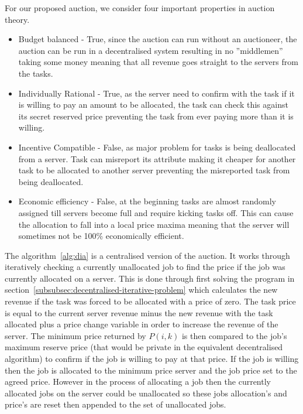 For our proposed auction, we consider four important properties in auction theory.
\begin{itemize}
    \item Budget balanced - True, since the auction can run without an auctioneer, the auction can be run in a
    decentralised system resulting in no ''middlemen'' taking some money meaning that all revenue goes straight to
    the servers from the tasks.
    \item Individually Rational - True, as the server need to confirm with the task if it is willing to pay an amount
    to be allocated, the task can check this against its secret reserved price preventing the task from ever paying
    more than it is willing.
    \item Incentive Compatible - False, as major problem for tasks is being deallocated from a server. Task can
    misreport its attribute making it cheaper for another task to be allocated to another server preventing the
    misreported task from being deallocated.
    \item Economic efficiency - False, at the beginning tasks are almost randomly assigned till servers become full and
    require kicking tasks off. This can cause the allocation to fall into a local price maxima meaning that the
    server will sometimes not be 100\% economically efficient.
\end{itemize}

The algorithm~\ref{alg:dia} is a centralised version of the auction. It works through iteratively checking a currently
unallocated job to find the price if the job was currently allocated on a server. This is done through first solving
the program in section~\ref{subsubsec:decentralised-iterative-problem} which calculates the new revenue if the task was
forced to be allocated with a price of zero. The task price is equal to the current server revenue minus the new
revenue with the task allocated plus a price change variable in order to increase the revenue of the server. The
minimum price returned by $P(i, k)$ is then compared to the job's maximum reserve price (that would be private in the
equivalent decentralised algorithm) to confirm if the job is willing to pay at that price. If the job is willing then
the job is allocated to the minimum price server and the job price set to the agreed price. However in the process of
allocating a job then the currently allocated jobs on the server could be unallocated so these jobs allocation's and
price's are reset then appended to the set of unallocated jobs.

